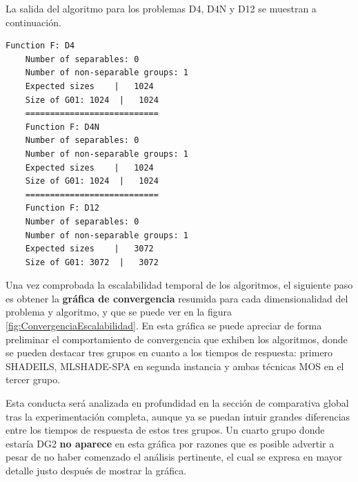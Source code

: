 \begin{itemize}
\begin{table}[h]
	\centering
	\caption{\textbf{DG2} - Escalabilidad }
	\label{tabla:ResDG2-Exp1}
\end{table}

\end{itemize}

La salida del algoritmo para los problemas D4, D4N y D12 se muestran a continuación.

\begin{lstlisting}[style=Consola,caption={Análisis de la matriz DSM tras la ejecución de DG2 para los problemas D4, D4N y D12N},captionpos=b]
	Function F: D4
	Number of separables: 0
	Number of non-separable groups: 1
	Expected sizes    |   1024
	Size of G01: 1024  |   1024
	===========================
	Function F: D4N
	Number of separables: 0
	Number of non-separable groups: 1
	Expected sizes    |   1024
	Size of G01: 1024  |   1024
	===========================
	Function F: D12
	Number of separables: 0
	Number of non-separable groups: 1
	Expected sizes    |   3072
	Size of G01: 3072  |   3072
\end{lstlisting}




Una vez comprobada la escalabilidad temporal de los algoritmos, el siguiente paso es obtener la \textbf{gráfica de convergencia} resumida para cada dimensionalidad del problema y algoritmo, y que se puede ver en la figura \ref{fig:ConvergenciaEscalabilidad}. En esta gráfica se puede apreciar de forma preliminar el comportamiento de convergencia que exhiben los algoritmos, donde se pueden destacar tres grupos en cuanto a los tiempos de respuesta: primero SHADEILS, MLSHADE-SPA en segunda instancia y ambas técnicas MOS en el tercer grupo. 

Esta conducta será analizada en profundidad en la sección de comparativa global tras la experimentación completa, aunque ya se puedan intuir grandes diferencias entre los tiempos de respuesta de estos tres grupos. Un cuarto grupo donde estaría DG2 \textbf{no aparece} en esta gráfica por razones que es posible advertir a pesar de no haber comenzado el análisis pertinente, el cual se expresa en mayor detalle justo después de mostrar la gráfica.

